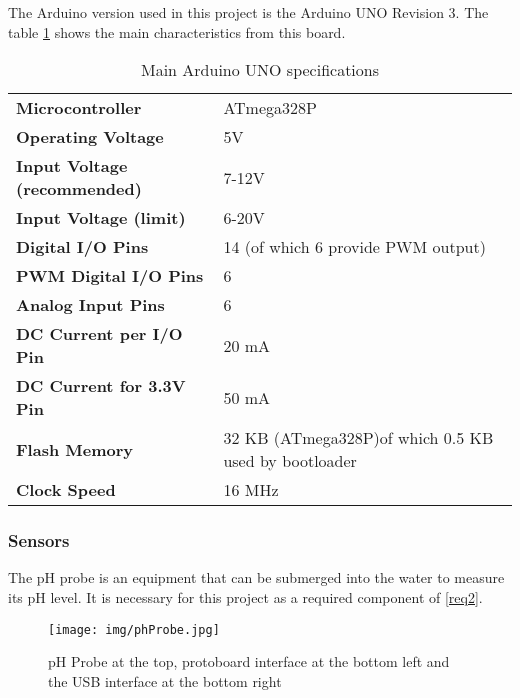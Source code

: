 The Arduino version used in this project is the Arduino UNO Revision 3.
The table \ref{uno_table} shows the main characteristics from this board.

\begin{table}[h]
\centering
\caption{Main Arduino UNO specifications \cite{arduino_overview}}
\label{uno_table}
\begin{tabular}{ll}
\textbf{Microcontroller}             & ATmega328P                                           \\
\textbf{Operating Voltage}           & 5V                                                   \\
\textbf{Input Voltage (recommended)} & 7-12V                                                \\ \textbf{Input Voltage (limit)}       & 6-20V                                                \\
\textbf{Digital I/O Pins}            & 14 (of which 6 provide PWM output)                   \\
\textbf{PWM Digital I/O Pins}        & 6                                                    \\
\textbf{Analog Input Pins}           & 6                                                    \\
\textbf{DC Current per I/O Pin}      & 20 mA                                                \\
\textbf{DC Current for 3.3V Pin}     & 50 mA                                                \\
\textbf{Flash Memory}                & 32 KB (ATmega328P)of which 0.5 KB used by bootloader \\
\textbf{Clock Speed}                 & 16 MHz                                              
\end{tabular}
\end{table}

\subsubsection{Sensors}
The pH probe is an equipment that can be submerged into the water to measure its pH level.
It is necessary for this project as a required component of \ref{req2}.

\begin{figure}[h]
    \centering
    \texttt{[image: img/phProbe.jpg]}
    \caption{pH Probe at the top, protoboard interface at the bottom left and the USB interface at the bottom right \cite{dfrobot_analog}}
    \label{fig:phProbe}
\end{figure}

